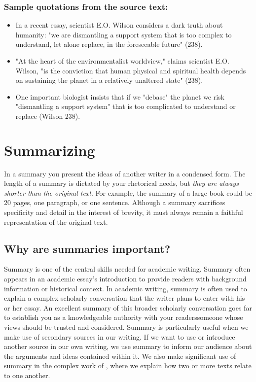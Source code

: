 \subsubsection*{Sample quotations from the source text:}

\begin{itemize}

\item In a recent essay, scientist E.O. Wilson considers a dark truth about humanity: "we are dismantling a support system that is too complex to understand, let alone replace, in the foreseeable future" (238).

\item "At the heart of the environmentalist worldview," claims scientist E.O. Wilson, "is the conviction that human physical and spiritual health depends on sustaining the planet in a relatively unaltered state" (238).

\item One important biologist insists that if we "debase" the planet we risk "dismantling a support system" that is too complicated to understand or replace (Wilson 238).

\end{itemize}

\hypertarget{summary}{}
\section{Summarizing}
In a summary you present the ideas of another writer in a condensed form. The
length of a summary is dictated by your rhetorical needs, but \emph{they are
always shorter than the original text}. For example, the summary of a large
book could be 20 pages, one paragraph, or one sentence. Although a summary
sacrifices specificity and detail in the interest of brevity, it must always
remain a faithful representation of the original text.


\subsection {Why are summaries important?}

Summary is one of the central skills needed for academic writing. Summary often appears
in an academic essay's introduction to provide readers with background information or historical context. In academic writing, summary is often used to explain a complex scholarly conversation that the writer plans to enter with his or her essay. An excellent summary of this broader scholarly conversation goes far to establish you as a knowledgeable authority with your readers\textemdash someone whose views should be trusted and considered. Summary is particularly useful when we make use of secondary sources in our writing. If we want to use or introduce another source in our own writing, we use summary to inform our audience about the arguments and ideas contained within it. We also make significant use of summary in the complex work of \hyperlink{synthesis}{\color{Ahrenge}{synthesis}}, where we explain how two or more texts relate to one another. 

